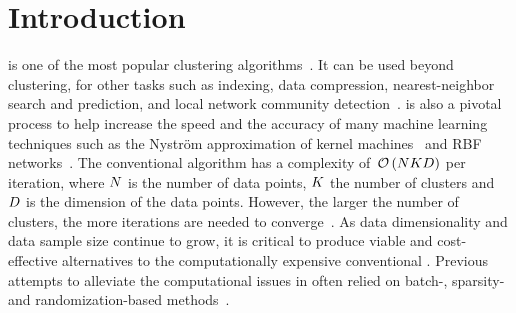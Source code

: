 \section{Introduction}

\kmeans is one of the most popular clustering algorithms~\cite{hartigan1979algorithm,jain2010data}. It can be used beyond clustering, for other tasks such as indexing, data compression,  nearest-neighbor search and prediction, and local network community detection~\cite{muja2014scalable,van2016local}. \kmeans is also a pivotal process to help increase the speed and the accuracy of many machine learning techniques such as the Nyström approximation of kernel machines~\cite{si2016computationally} and RBF networks~\cite{que2016back}.
%
The  conventional  \kmeans  algorithm  has  a  complexity  of~$\mathcal{O}\left (N K D\right )$ per iteration, where $N$ is the number of data points, $K$ the number of clusters and $D$ is the dimension of the data points.
However, the larger the number of clusters, the more iterations are needed to converge~\cite{arthur2006slow}.
%
As data dimensionality and data sample size continue to grow, it is critical to produce viable and cost-effective alternatives to the computationally expensive conventional \kmeans. 
Previous attempts to alleviate the computational issues in \kmeans often relied on batch-, sparsity- and randomization-based methods~\cite{Sculley2010Web, boutsidis2014randomized,shen2017compressed,liu2017sparse}.

